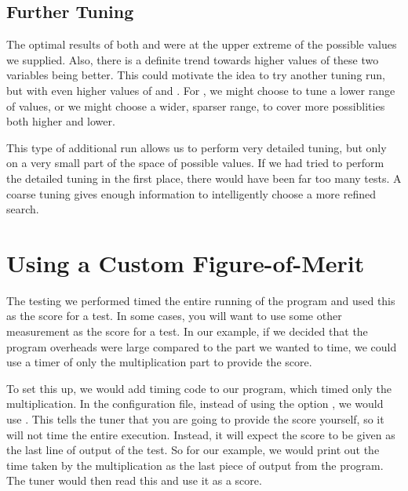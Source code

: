 \documentclass[a4paper]{article}
\begin{document}







\subsection{Further Tuning}
The optimal results of both  and  were at the upper 
extreme of the possible values we supplied. Also, there is a definite trend 
towards higher values of these two variables being better. This could 
motivate the idea to try another tuning run, but with even higher values of 
 and . For , we might choose to tune 
a lower range of values, or we might choose a wider, sparser range, to cover 
more possiblities both higher and lower.

This type of additional run allows us to perform very detailed tuning, 
but only on a very small part of the space of possible values. If we had 
tried to perform the detailed tuning in the first place, there would have 
been far too many tests. A coarse tuning gives enough information to 
intelligently choose a more refined search.


\clearpage

\section{Using a Custom Figure-of-Merit}
\label{sec:custom-fom}
The testing we performed timed the entire running of the program and used 
this as the score for a test. In some cases, you will want to use some other 
measurement as the score for a test. In our example, if we decided that the 
program overheads were large compared to the part we wanted to time, we could 
use a timer of only the multiplication part to provide the score.

To set this up, we would add timing code to our program, which timed only the 
multiplication. In the configuration file, instead of using the 
option , we would use 
. This tells the tuner that you are going to 
provide the score yourself, so it will not time the entire execution. 
Instead, it will expect the score to be given as the last line of output of 
the test. So for our example, we would print out the time taken by the 
multiplication as the last piece of output from the program. The tuner would 
then read this and use it as a score.
\end{document}
